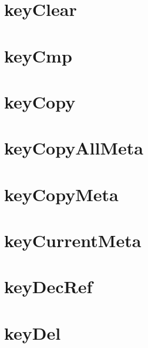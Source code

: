 \let\mypdfximage\pdfximage\def\pdfximage{\immediate\mypdfximage}\documentclass[twoside]{book}
\newcommand{\+}{\discretionary{\mbox{\scriptsize$\hookleftarrow$}}{}{}}
\begin{document}
\chapter{key\+Clear}
\label{doc_contrib_api_reviews_core_keyClear_md}

\chapter{key\+Cmp}
\label{doc_contrib_api_reviews_core_keyCmp_md}

\chapter{key\+Copy}
\label{doc_contrib_api_reviews_core_keyCopy_md}

\chapter{key\+Copy\+All\+Meta}
\label{doc_contrib_api_reviews_core_keyCopyAllMeta_md}

\chapter{key\+Copy\+Meta}
\label{doc_contrib_api_reviews_core_keyCopyMeta_md}

\chapter{key\+Current\+Meta}
\label{doc_contrib_api_reviews_core_keyCurrentMeta_md}

\chapter{key\+Dec\+Ref}
\label{doc_contrib_api_reviews_core_keyDecRef_md}

\chapter{key\+Del}
\label{doc_contrib_api_reviews_core_keyDel_md}

\end{document}
